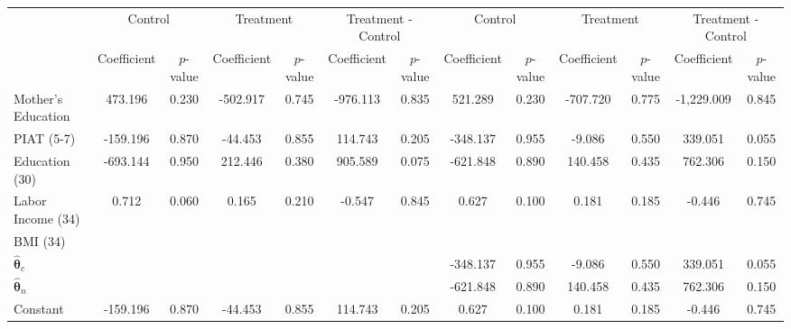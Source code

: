 \begin{tabular}{lcccccccccccc} \toprule
&\multicolumn{2}{c}{Control} & \multicolumn{2}{c}{Treatment} & \multicolumn{2}{c}{Treatment - Control} & \multicolumn{2}{c}{Control} & \multicolumn{2}{c}{Treatment} & \multicolumn{2}{c}{Treatment - Control} \\
 & Coefficient  & $p$-value  & Coefficient  & $p$-value & Coefficient  & $p$-value  & Coefficient  & $p$-value  & Coefficient  & $p$-value  & Coefficient  & $p$-value \\ \midrule
Mother's Education &   473.196 &     0.230 &  -502.917 &     0.745 &  -976.113 &     0.835 &   521.289 &     0.230 &  -707.720 &     0.775 & -1,229.009 &     0.845 \\  
PIAT (5-7) &  -159.196 &     0.870 &   -44.453 &     0.855 &   114.743 &     0.205 &  -348.137 &     0.955 &    -9.086 &     0.550 &   339.051 &     0.055 \\  
Education (30) &  -693.144 &     0.950 &   212.446 &     0.380 &   905.589 &     0.075 &  -621.848 &     0.890 &   140.458 &     0.435 &   762.306 &     0.150 \\  
Labor Income (34) &     0.712 &     0.060 &     0.165 &     0.210 &    -0.547 &     0.845 &     0.627 &     0.100 &     0.181 &     0.185 &    -0.446 &     0.745 \\  
BMI (34)  &         &         &         &         &         &         &         &         &         &         &         &          \\  
$\hat{\bm{\theta}}_{c}$ &         &         &         &         &         &         &  -348.137 &     0.955 &    -9.086 &     0.550 &   339.051 &     0.055 \\  
$\hat{\bm{\theta}}_{n}$ &         &         &         &         &         &         &  -621.848 &     0.890 &   140.458 &     0.435 &   762.306 &     0.150 \\  
Constant &  -159.196 &     0.870 &   -44.453 &     0.855 &   114.743 &     0.205 &     0.627 &     0.100 &     0.181 &     0.185 &    -0.446 &     0.745 \\  
\bottomrule  \end{tabular}
